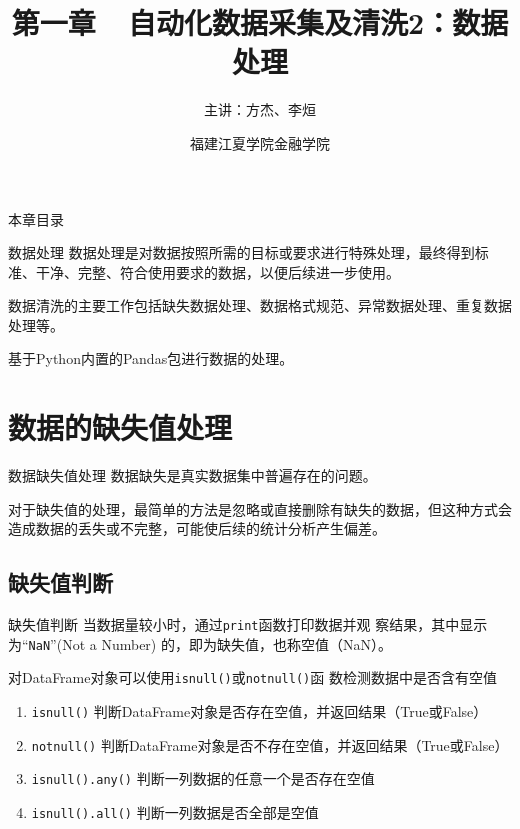 \documentclass[t]{beamer}
\begin{document}
\fontsize{11}{18}\selectfont


\CTEXindent


\title{第一章~~自动化数据采集及清洗2：数据处理}

\author{主讲：方杰、李烜}
\date{福建江夏学院金融学院}

\maketitle

\begin{frame}{本章目录}
\begin{multicols*}{2}
     \tableofcontents  
\end{multicols*}
     
\end{frame}





\begin{frame}[fragile]{数据处理}
数据处理是对数据按照所需的目标或要求进行特殊处理，最终得到标准、干净、完整、符合使用要求的数据，以便后续进一步使用。

数据清洗的主要工作包括缺失数据处理、数据格式规范、异常数据处理、重复数据处理等。

基于Python内置的Pandas包进行数据的处理。
\end{frame}



\section{数据的缺失值处理}
\begin{frame}[fragile]{数据缺失值处理}
数据缺失是真实数据集中普遍存在的问题。

对于缺失值的处理，最简单的方法是忽略或直接删除有缺失的数据，但这种方式会造成数据的丢失或不完整，可能使后续的统计分析产生偏差。
\end{frame}


\subsection{缺失值判断}
\begin{frame}[fragile]{缺失值判断}
    当数据量较小时，通过\verb|print|函数打印数据并观
    察结果，其中显示为“\verb|NaN|”(Not a Number)
    的，即为缺失值，也称空值（NaN）。
    
对DataFrame对象可以使用\verb|isnull()|或\verb|notnull()|函
    数检测数据中是否含有空值
\begin{enumerate}
    \item \verb|isnull()| 判断DataFrame对象是否存在空值，并返回结果（True或False）
    \item \verb|notnull()| 判断DataFrame对象是否不存在空值，并返回结果（True或False）
    \item \verb|isnull().any()| 判断{\color{red}一列数据}的{\color{red}任意一个}是否存在空值
    \item \verb|isnull().all()| 判断{\color{blue}一列数据}是否{\color{blue}全部}是空值
\end{enumerate}
\end{frame}
\end{document}
